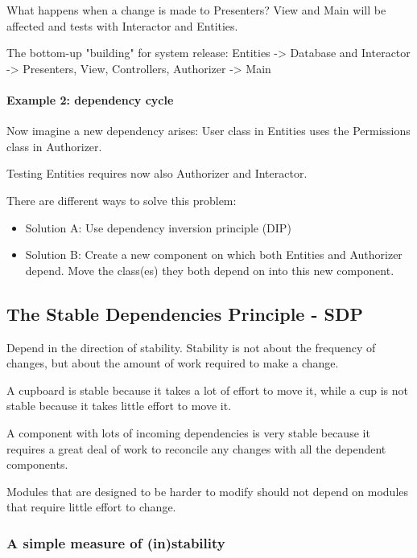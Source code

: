 What happens when a change is made to Presenters?
View and Main will be affected and tests with
Interactor and Entities.

The bottom-up "building" for system release:
Entities -> Database and Interactor -> Presenters, View, Controllers, Authorizer -> Main

\paragraph{Example 2: dependency cycle}

Now imagine a new dependency arises: User class in Entities uses the Permissions
class in Authorizer.

Testing Entities requires now also Authorizer and Interactor.

There are different ways to solve this problem:

\begin{itemize}
  \item Solution A: Use dependency inversion principle (DIP)
  \item Solution B: Create a new component on which both Entities and
        Authorizer depend. Move the class(es) they both depend on into this new
        component.

\end{itemize}


\subsection{The Stable Dependencies Principle - SDP}

Depend in the direction of stability.
Stability is not about the frequency of changes, but about the amount of work
required to make a change.

A cupboard is stable because it takes a lot of effort to move it,
while a cup is not stable because it takes little effort to move it.



A component with lots of incoming dependencies is very stable because it
requires a great deal of work to reconcile any changes with all the dependent
components.

Modules that are designed to be harder to modify should not depend on modules
that require little effort to change.


\subsubsection{A simple measure of (in)stability}


